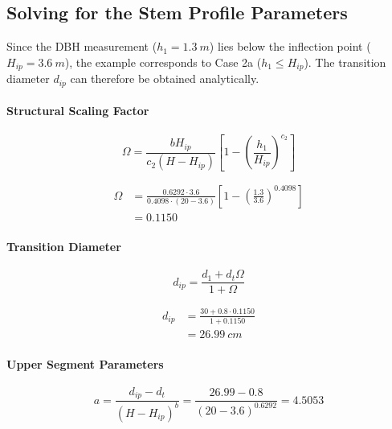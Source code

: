 \documentclass[twocolumn, bibliography=totoc]{scrartcl}
\begin{document}
\subsection{Solving for the Stem Profile Parameters}

Since the DBH measurement (\(h_1=\qty{1.3}{m}\)) lies below the inflection point (\(H_{ip}=\qty{3.6}{m}\)), the example corresponds to Case 2a (\(h_1 \le H_{ip}\)). The transition diameter \(d_{ip}\) can therefore be obtained analytically.

\paragraph{Structural Scaling Factor}

\begin{equation}
\Omega
=
\frac{bH_{ip}}
     {c_2(H-H_{ip})}
\left[
1-\left(\frac{h_1}{H_{ip}}\right)^{c_2}
\right]
\end{equation}

\begin{equation}
\begin{aligned}
\Omega
&=
\frac{0.6292 \cdot 3.6}
     {0.4098 \cdot (20-3.6)}
\left[
1-\left(\frac{1.3}{3.6}\right)^{0.4098}
\right] \\
&= 0.1150
\end{aligned}
\end{equation}

\paragraph{Transition Diameter}

\begin{equation}
d_{ip}
=
\frac{d_1+d_t\Omega}
     {1+\Omega}
\end{equation}

\begin{equation}
\begin{aligned}
d_{ip}
&=
\frac{30 + 0.8 \cdot 0.1150}
     {1 + 0.1150} \\
&=
\qty{26.99}{cm}
\end{aligned}
\end{equation}

\paragraph{Upper Segment Parameters}

\begin{equation}
a
=
\frac{d_{ip}-d_t}
     {(H-H_{ip})^b}
=
\frac{26.99-0.8}
     {(20-3.6)^{0.6292}}
=
4.5053
\end{equation}
\end{document}
